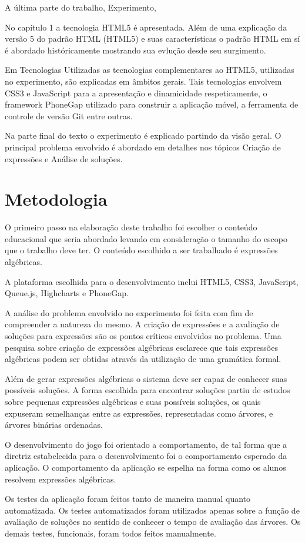 A última parte do trabalho, Experimento, 

	No capítulo 1 a tecnologia HTML5 é apresentada. Além de uma explicação da versão 5 do padrão HTML (HTML5) e suas características o padrão HTML em sí é abordado históricamente mostrando sua evlução desde seu surgimento.
	
	Em Tecnologias Utilizadas as tecnologias complementares ao HTML5, utilizadas no experimento, são  explicadas em âmbitos gerais. Tais tecnologias envolvem CSS3 e JavaScript para a apresentação e dinamicidade respeticamente, o framework PhoneGap utilizado para construir a aplicação móvel, a ferramenta de controle de versão Git entre outras.
	
	Na parte final do texto o experimento é explicado partindo da visão geral. O principal problema envolvido é abordado em detalhes nos tópicos Criação de expressões e Análise de soluções.
	
\section{Metodologia}
O primeiro passo na elaboração deste trabalho foi escolher o conteúdo educacional que seria abordado levando em consideração o tamanho do escopo que o trabalho deve ter. O conteúdo escolhido a ser trabalhado é expressões algébricas.

	A plataforma escolhida para o desenvolvimento inclui HTML5, CSS3, JavaScript, Queue.js, Highcharts e PhoneGap.
	
	A análise do problema envolvido no experimento foi feita com fim de compreender a natureza do mesmo. A criação de expressões e a avaliação de soluções para expressões são os pontos críticos envolvidos no problema. Uma pesquisa sobre criação de expressões algébricas esclarece que tais expressões algébricas podem ser obtidas através da utilização de uma gramática formal.
	
	Além de gerar expressões algébricas o sistema deve ser capaz de conhecer suas possíveis soluções. A forma escolhida para encontrar soluções partiu de estudos sobre pequenas expressões algébricas e suas possíveis soluções, os quais expuseram semelhanças entre as expressões, representadas como árvores, e árvores binárias ordenadas.
	
	O desenvolvimento do jogo foi orientado a comportamento, de tal forma que a diretriz estabelecida para o desenvolvimento foi o comportamento esperado da aplicação. O comportamento da aplicação se espelha na forma como os alunos resolvem expressões algébricas.
	
	Os testes da aplicação foram feitos tanto de maneira manual quanto automatizada. Os testes automatizados foram utilizados apenas sobre a função de avaliação de soluções no sentido de conhecer o tempo de avaliação das árvores. Os demais testes, funcionais, foram todos feitos manualmente.
